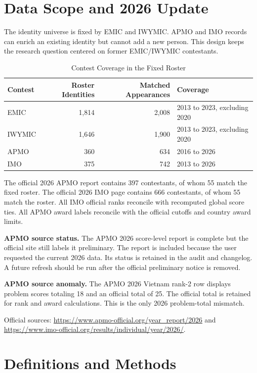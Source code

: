 \documentclass[11pt]{article}
\begin{document}
\section{Data Scope and 2026 Update}

The identity universe is fixed by EMIC and IWYMIC. APMO and IMO records can enrich an existing identity but cannot add a new person. This design keeps the research question centered on former EMIC/IWYMIC contestants.

\begin{table}[H]
\centering
\caption{Contest Coverage in the Fixed Roster}
\begin{tabular}{lrrl}
\toprule
Contest & Roster Identities & Matched Appearances & Coverage \\
\midrule
EMIC & 1,814 & 2,008 & 2013 to 2023, excluding 2020 \\
IWYMIC & 1,646 & 1,900 & 2013 to 2023, excluding 2020 \\
APMO & 360 & 634 & 2016 to 2026 \\
IMO & 375 & 742 & 2013 to 2026 \\
\bottomrule
\end{tabular}
\end{table}

The official 2026 APMO report contains 397 contestants, of whom 55 match the fixed roster. The official 2026 IMO page contains 666 contestants, of whom 55 match the roster. All IMO official ranks reconcile with recomputed global score ties. All APMO award labels reconcile with the official cutoffs and country award limits.

\textbf{APMO source status.} The APMO 2026 score-level report is complete but the official site still labels it preliminary. The report is included because the user requested the current 2026 data. Its status is retained in the audit and changelog. A future refresh should be run after the official preliminary notice is removed.

\textbf{APMO source anomaly.} The APMO 2026 Vietnam rank-2 row displays problem scores totaling 18 and an official total of 25. The official total is retained for rank and award calculations. This is the only 2026 problem-total mismatch.

Official sources: \url{https://www.apmo-official.org/year_report/2026} and \url{https://www.imo-official.org/results/individual/year/2026/}.

\section{Definitions and Methods}
\end{document}
